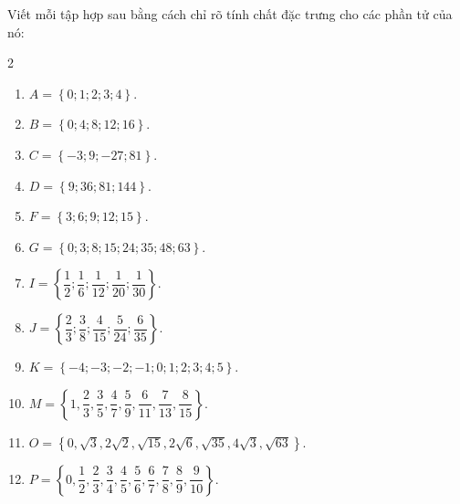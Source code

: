 \begin{bt}%
	Viết mỗi tập hợp sau bằng cách chỉ rõ tính chất đặc trưng cho các phần tử của nó:
	\begin{multicols}{2}
		\begin{enumerate}
			\item $A=\left\{0;1;2;3;4\right\}$.
			\item $B=\left\{0;4;8;12;16\right\}$.
			\item $C=\left\{-3;9;-27;81\right\}$.	
			\item $D=\left\{9;36;81;144\right\}$.
			
			\item $F=\left\{3;6;9;12;15\right\}$.
			\item $G=\left\{0;3;8;15;24;35;48;63\right\}$.
			\item $I=\left\{\dfrac{1}{2};\dfrac{1}{6};\dfrac{1}{12};\dfrac{1}{20};\dfrac{1}{30}\right\}$.
			\item $J=\left\{\dfrac{2}{3};\dfrac{3}{8};\dfrac{4}{15};\dfrac{5}{24};\dfrac{6}{35}\right\}$.
			\item $K=\left\{-4;-3;-2;-1;0;1;2;3;4;5\right\}$.
			\item $M=\left\{1,\dfrac{2}{3},\dfrac{3}{5},\dfrac{4}{7},\dfrac{5}{9},\dfrac{6}{11},\dfrac{7}{13},\dfrac{8}{15}\right\}$.
			\item $O=\left\{0,\sqrt{3},2\sqrt{2},\sqrt{15},2\sqrt{6},\sqrt{35},4\sqrt{3},\sqrt{63}\right\}$.	
			\item $P=\left\{0,\dfrac{1}{2},\dfrac{2}{3},\dfrac{3}{4},\dfrac{4}{5},\dfrac{5}{6},\dfrac{6}{7},\dfrac{7}{8},\dfrac{8}{9},\dfrac{9}{10}\right\}$.
		\end{enumerate}	
	\end{multicols}
	

\end{bt}
